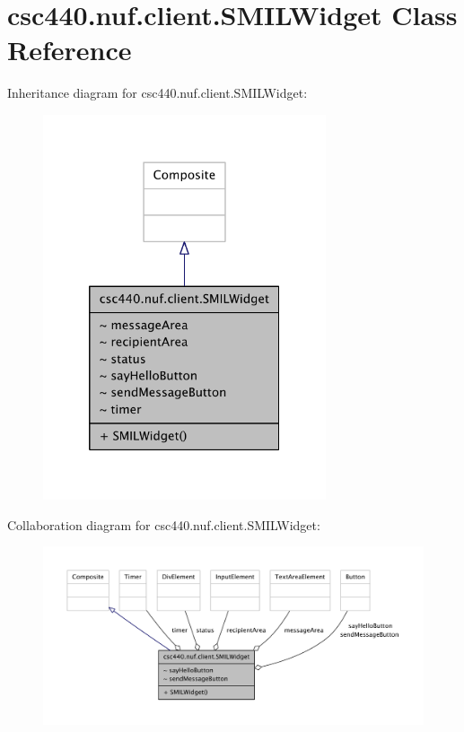 \hypertarget{classcsc440_1_1nuf_1_1client_1_1_s_m_i_l_widget}{\section{csc440.\-nuf.\-client.\-S\-M\-I\-L\-Widget Class Reference}
\label{classcsc440_1_1nuf_1_1client_1_1_s_m_i_l_widget}
}


Inheritance diagram for csc440.\-nuf.\-client.\-S\-M\-I\-L\-Widget\-:
\nopagebreak
\begin{figure}[H]
\begin{center}
\leavevmode
\includegraphics[width=236pt]{classcsc440_1_1nuf_1_1client_1_1_s_m_i_l_widget__inherit__graph}
\end{center}
\end{figure}


Collaboration diagram for csc440.\-nuf.\-client.\-S\-M\-I\-L\-Widget\-:
\nopagebreak
\begin{figure}[H]
\begin{center}
\leavevmode
\includegraphics[width=350pt]{classcsc440_1_1nuf_1_1client_1_1_s_m_i_l_widget__coll__graph}
\end{center}
\end{figure}
